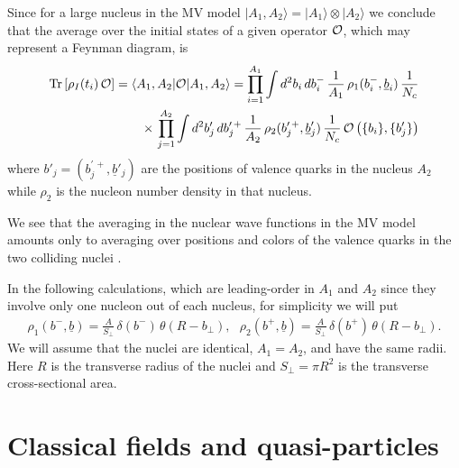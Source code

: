 \documentclass[onecolumn,showpacs,nobibnotes,nofootinbib,12pt,aps,prd,showpacs,notitlepage,nofootinbib,preprintnumbers,amsmath,amssymb]{article}
\newcommand{\un}[1]{\underline{#1}}
\newcommand{\Tr}{\mathrm{Tr}}
\begin{document}
Since for a large nucleus in the MV model $| A_1, A_2 \rangle = | A_1
\rangle \otimes | A_2 \rangle$ we conclude that the average over the
initial states of a given operator $\cal O$, which may represent a
Feynman diagram, is
\begin{align}
  \Tr \left[\rho_I (t_i) \, {\cal O} \right] = \langle A_1, A_2 |
  {\cal O} | A_1, A_2 \rangle = \prod_{i=1}^{A_1} \int d^2 b_i \, d
  b_i^- \, \frac{1}{A_1} \, \rho_1 (b_i^-, \un{b}_i) \, \frac{1}{N_c}
  \notag \\ \times \, \prod_{j=1}^{A_2} \int d^2 b'_j \, d b_j^{\prime
    \, +} \, \frac{1}{A_2} \, \rho_2 (b_j^{\prime \, +}, \un{b}'_j) \,
  \frac{1}{N_c} \, {\cal O} \left( \{ b_i \}, \{ b'_j \}
  \right) \label{eq:DMinit3}
\end{align}
where $b'_j = (b_j^{\prime \, +}, \un{b}'_j)$ are the positions of
valence quarks in the nucleus $A_2$ while $\rho_2$ is the nucleon
number density in that nucleus. 

We see that the averaging in the nuclear wave functions in the MV model
amounts only to averaging over positions and colors of the valence
quarks in the two colliding nuclei
\cite{McLerran:1993ni,McLerran:1993ka,McLerran:1994vd,Kovchegov:1996ty}. 

In the following calculations, which are leading-order in $A_1$ and
$A_2$ since they involve only one nucleon out of each nucleus, for
simplicity we will put
\begin{align}
  \label{eq:rhoAA}
  \rho_1 (b^-, \un{b}) = \frac{A}{S_\perp} \, \delta (b^-) \, \theta
  (R - b_\perp), \ \ \ \rho_2 (b^+, \un{b}) = \frac{A}{S_\perp} \,
  \delta (b^+) \, \theta (R - b_\perp).
\end{align}
We will assume that the nuclei are identical, $A_1 = A_2$, and have
the same radii. Here $R$ is the transverse radius of the nuclei and
$S_\perp = \pi R^2$ is the transverse cross-sectional area.





\section{Classical fields and quasi-particles}
\label{sec:quasi}

\end{document}
